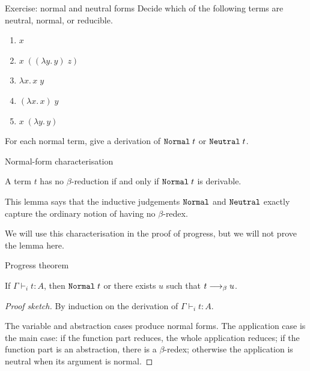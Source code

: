 \begin{frame}{Exercise: normal and neutral forms}
  Decide which of the following terms are neutral, normal, or reducible.

  \begin{enumerate}
    \item $x$
    \item $x\;((\lambda y.\,y)\;z)$
    \item $\lambda x.\,x\;y$
    \item $(\lambda x.\,x)\;y$
    \item $x\;(\lambda y.\,y)$
  \end{enumerate}

  \vfill

  For each normal term, give a derivation of $\mathtt{Normal}\;t$ or $\mathtt{Neutral}\;t$.
\end{frame}

\begin{frame}{Normal-form characterisation}
  \begin{lemma}
    A term $t$ has no $\beta$-reduction if and only if $\mathtt{Normal}\;t$ is derivable.
  \end{lemma}

  \vfill

  This lemma says that the inductive judgements $\mathtt{Normal}$ and $\mathtt{Neutral}$ exactly
  capture the ordinary notion of having no $\beta$-redex.

  \medskip

  We will use this characterisation in the proof of progress, but we will not
  prove the lemma here.
\end{frame}

\begin{frame}{Progress theorem}
  \begin{theorem}[Progress]
    If $\Gamma \vdash_i t : A$, then $\mathtt{Normal}\;t$ or there exists $u$ such that
    $t \longrightarrow_{\beta} u$.
  \end{theorem}

  \begin{proof}[Proof sketch]
    By induction on the derivation of $\Gamma \vdash_i t : A$.

    \medskip

    The variable and abstraction cases produce normal forms.  The application
    case is the main case: if the function part reduces, the whole application
    reduces; if the function part is an abstraction, there is a $\beta$-redex;
    otherwise the application is neutral when its argument is normal.
  \end{proof}
\end{frame}

